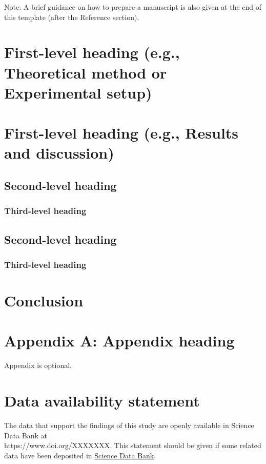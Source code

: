 \documentclass{cpbtex}
\begin{document}
\begin{CJK*}{GBK}{song}
Note: A brief guidance on how to prepare a manuscript is also given at the end of this template (after the Reference section).

\section{First-level heading (e.g., Theoretical method or Experimental setup)}


\section{First-level heading (e.g., Results and discussion)}


\subsection{Second-level heading}


\subsubsection{Third-level heading}


\subsection{Second-level heading}


\subsubsection{Third-level heading}


\section{Conclusion}


\section*{Appendix A: Appendix heading}
Appendix is optional.



\section*{Data availability statement}
The data that support the findings of this study are openly available in Science Data Bank at\\ https://www.doi.org/XXXXXXX. This statement should be given if some related data have been deposited in \href{https://www.scidb.cn/en}{Science Data Bank}.


\end{CJK*}
\end{document}

